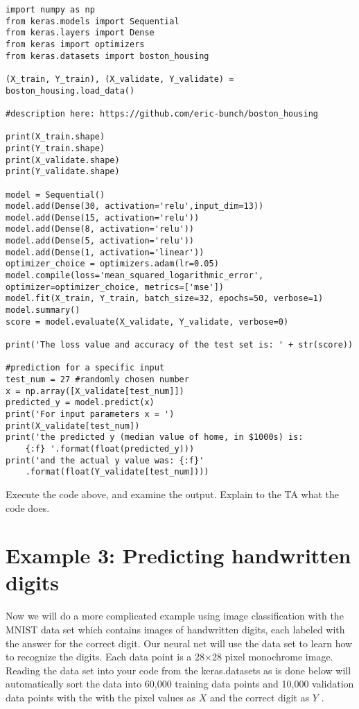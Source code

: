 \begin{lstlisting}
import numpy as np
from keras.models import Sequential
from keras.layers import Dense
from keras import optimizers
from keras.datasets import boston_housing

(X_train, Y_train), (X_validate, Y_validate) = boston_housing.load_data()

#description here: https://github.com/eric-bunch/boston_housing

print(X_train.shape)
print(Y_train.shape)
print(X_validate.shape)
print(Y_validate.shape)

model = Sequential()
model.add(Dense(30, activation='relu',input_dim=13))
model.add(Dense(15, activation='relu'))
model.add(Dense(8, activation='relu'))
model.add(Dense(5, activation='relu'))
model.add(Dense(1, activation='linear'))
optimizer_choice = optimizers.adam(lr=0.05)
model.compile(loss='mean_squared_logarithmic_error',
optimizer=optimizer_choice, metrics=['mse'])
model.fit(X_train, Y_train, batch_size=32, epochs=50, verbose=1)
model.summary()
score = model.evaluate(X_validate, Y_validate, verbose=0)

print('The loss value and accuracy of the test set is: ' + str(score))

#prediction for a specific input
test_num = 27 #randomly chosen number
x = np.array([X_validate[test_num]])
predicted_y = model.predict(x)
print('For input parameters x = ')
print(X_validate[test_num])
print('the predicted y (median value of home, in $1000s) is:
	{:f} '.format(float(predicted_y)))
print('and the actual y value was: {:f}'
	.format(float(Y_validate[test_num])))
\end{lstlisting}

\begin{problem}\label{P13.3} Execute the code above, and examine the output. Explain to the TA what
the code does.\end{problem}


\section*{Example 3: Predicting handwritten digits}
Now we will do a more complicated example using image classification with the
MNIST data set which contains images of handwritten digits, each labeled with
the answer for the correct digit. Our neural net will use the data set to learn how
to recognize the digits. Each data point is a 28×28 pixel monochrome image.
Reading the data set into your code from the keras.datasets as is done below will
automatically sort the data into 60,000 training data points and 10,000 validation
data points with the with the pixel values as $X$ and the correct digit as $Y$ .\\

